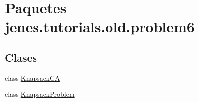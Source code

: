 \hypertarget{namespacejenes_1_1tutorials_1_1old_1_1problem6}{\section{Paquetes jenes.\-tutorials.\-old.\-problem6}
\label{namespacejenes_1_1tutorials_1_1old_1_1problem6}
}
\subsection*{Clases}
\begin{DoxyCompactItemize}
\item 
class \hyperlink{classjenes_1_1tutorials_1_1old_1_1problem6_1_1_knapsack_g_a}{Knapsack\-G\-A}
\item 
class \hyperlink{classjenes_1_1tutorials_1_1old_1_1problem6_1_1_knapsack_problem}{Knapsack\-Problem}
\end{DoxyCompactItemize}
